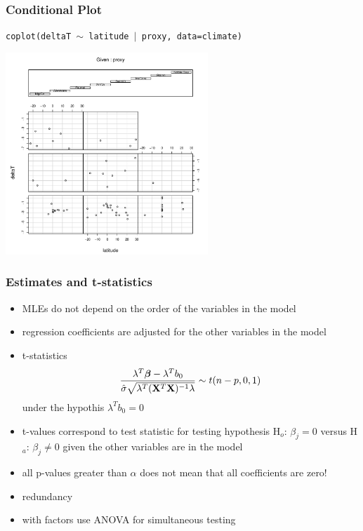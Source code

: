\documentclass[handout]{beamer}
\begin{document}
\begin{frame}
  \frametitle{Conditional Plot}
{\tt coplot(deltaT $\sim$ latitude $\mid$ proxy, data=climate)}
  \centerline{\includegraphics[height=3in]{temp-lat-proaxy}}
\end{frame}

\begin{frame}
  \frametitle{Estimates and t-statistics}
  \begin{itemize}
  \item MLEs do not depend on the order of the variables in the model \pause
  \item regression coefficients are adjusted for the other variables
    in the model \pause
\item t-statistics  $$\frac{\lambda^T\boldsymbol{\beta} - \lambda^Tb_0}
{ \hat{\sigma} \sqrt{\lambda^T (\mathbf{X}^T\mathbf{X})^{-1} \lambda}} \sim t(n - p, 0,
1)$$
under the hypothis $\lambda^Tb_0 = 0$
  \item t-values  correspond to test statistic for testing hypothesis
    H$_o$: $\beta_j = 0$ versus H$_a$: $\beta_j \neq 0$ given  the
    other variables are in the model \pause
  \item all p-values greater than $\alpha$ does not mean that all
    coefficients are zero! \pause
 \item redundancy \pause
 \item with factors use ANOVA for simultaneous testing \pause
  \end{itemize}
\end{frame}
\end{document}
